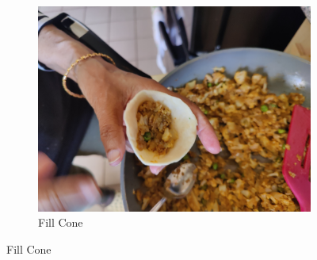 \begin{figure}[H]
\begin{subfigure}[b]{0.3\textwidth}
    \includegraphics[width=\textwidth]{Samosa/Images/IMG_20231230_143723.jpg}
    \caption{Fill Cone}
  \end{subfigure}
  
  \medskip %


\end{figure}
